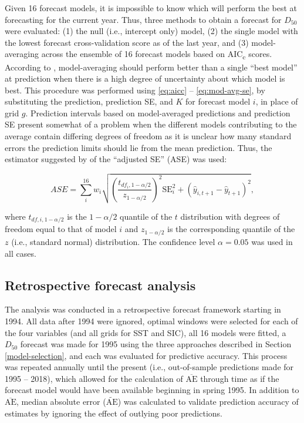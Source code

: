 \documentclass[12pt,]{book}
\theoremstyle{definition}
\theoremstyle{definition}
\theoremstyle{definition}
\theoremstyle{remark}
\begin{document}
\noindent
Given 16 forecast models, it is impossible to know which will perform
the best at forecasting for the current year. Thus, three methods to
obtain a forecast for \(D_{50}\) were evaluated: (1) the null (i.e.,
intercept only) model, (2) the single model with the lowest forecast
cross-validation score as of the last year, and (3) model-averaging
across the ensemble of 16 forecast models based on AIC\textsubscript{c}
scores. According to \citet{burnham-anderson-2002}, model-averaging
should perform better than a single ``best model'' at prediction when
there is a high degree of uncertainty about which model is best. This
procedure was performed using \eqref{eq:aicc} -- \eqref{eq:mod-avg-se}, by
substituting the prediction, prediction SE, and \(K\) for forecast model
\(i\), in place of grid \(g\). Prediction intervals based on
model-averaged predictions and prediction SE present somewhat of a
problem when the different models contributing to the average contain
differing degrees of freedom as it is unclear how many standard errors
the prediction limits should lie from the mean prediction. Thus, the
estimator suggested by \citet{burnham-anderson-2002} of the ``adjusted
SE'' (ASE) was used:

\begin{equation}
  ASE=\sum_i^{16} w_i \sqrt{\left(\frac{t_{df_i,1-\alpha/2}}{z_{1-\alpha/2}}\right)^2 \text{SE}_i^2+(\hat{y}_{i,t+1}-\hat{y}_{t+1})^2},
\label{eq:ase}
\end{equation}

\noindent
where \(t_{df,i,1-\alpha/2}\) is the \(1-\alpha/2\) quantile of the
\(t\) distribution with degrees of freedom equal to that of model \(i\)
and \(z_{1-\alpha/2}\) is the corresponding quantile of the \(z\) (i.e.,
standard normal) distribution. The confidence level \(\alpha = 0.05\)
was used in all cases.

\subsection{Retrospective forecast analysis}\label{retro}

\noindent
The analysis was conducted in a retrospective forecast framework
starting in 1994. All data after 1994 were ignored, optimal windows were
selected for each of the four variables (and all grids for SST and SIC),
all 16 models were fitted, a \(D_{50}\) forecast was made for 1995 using
the three approaches described in Section \ref{model-selection}, and
each was evaluated for predictive accuracy. This process was repeated
annually until the present (i.e., out-of-sample predictions made for
1995 -- 2018), which allowed for the calculation of
\(\overline{\text{AE}}\) through time as if the forecast model would
have been available beginning in spring 1995. In addition to
\(\overline{\text{AE}}\), median absolute error
(\(\widetilde{\text{AE}}\)) was calculated to validate prediction
accuracy of estimates by ignoring the effect of outlying poor
predictions.
\end{document}
